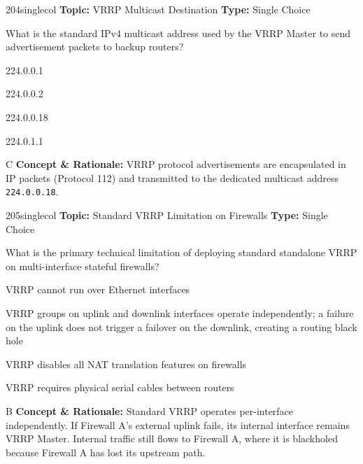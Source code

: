 \begin{qcard}{204}{singlecol}
\textcolor{darkslate!75}{\small\textbf{Topic:} VRRP Multicast Destination \hfill \textbf{Type:} Single Choice}\vspace{0.4em}\par
What is the standard IPv4 multicast address used by the VRRP Master to send advertisement packets to backup routers?
\begin{qoptions}
\item 224.0.0.1
\item 224.0.0.2
\item 224.0.0.18
\item 224.0.1.1
\end{qoptions}
\end{qcard}
\nopagebreak
\begin{explainbox}{C}
\textbf{Concept \& Rationale:} VRRP protocol advertisements are encapsulated in IP packets (Protocol 112) and transmitted to the dedicated multicast address \texttt{224.0.0.18}.
\end{explainbox}

\begin{qcard}{205}{singlecol}
\textcolor{darkslate!75}{\small\textbf{Topic:} Standard VRRP Limitation on Firewalls \hfill \textbf{Type:} Single Choice}\vspace{0.4em}\par
What is the primary technical limitation of deploying standard standalone VRRP on multi-interface stateful firewalls?
\begin{qoptions}
\item VRRP cannot run over Ethernet interfaces
\item VRRP groups on uplink and downlink interfaces operate independently; a failure on the uplink does not trigger a failover on the downlink, creating a routing black hole
\item VRRP disables all NAT translation features on firewalls
\item VRRP requires physical serial cables between routers
\end{qoptions}
\end{qcard}
\nopagebreak
\begin{explainbox}{B}
\textbf{Concept \& Rationale:} Standard VRRP operates per-interface independently. If Firewall A's external uplink fails, its internal interface remains VRRP Master. Internal traffic still flows to Firewall A, where it is blackholed because Firewall A has lost its upstream path.
\end{explainbox}

